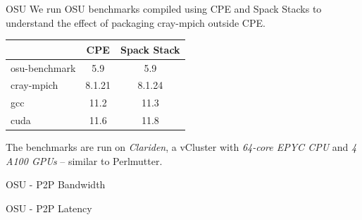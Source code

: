 \documentclass[aspectratio=43]{beamer}
\begin{document}

\begin{frame}[fragile]{OSU}
    We run OSU benchmarks compiled using CPE and Spack Stacks to understand the effect of packaging cray-mpich outside CPE.
\begin{center}
    \begin{tabular}{l |c  c }
                      & CPE   & Spack Stack \\
          \hline
        osu-benchmark & 5.9   & 5.9       \\
        cray-mpich    & 8.1.21& 8.1.24    \\
        gcc           & 11.2  & 11.3      \\
        cuda          & 11.6  & 11.8      \\
    \end{tabular}
\end{center}

    The benchmarks are run on \emph{Clariden}, a vCluster with \emph{64-core EPYC CPU} and  \emph{4 A100 GPUs} -- similar to Perlmutter.

\end{frame}

\begin{frame}[fragile]{OSU - P2P Bandwidth}
    \begin{center}
        
    \end{center}
\end{frame}

\begin{frame}[fragile]{OSU - P2P Latency}
    \begin{center}
        
    \end{center}
\end{frame}
\end{document}
